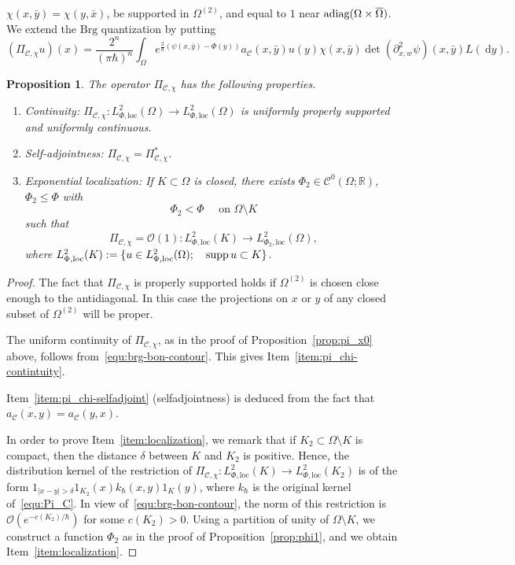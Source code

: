 \documentclass{article}
\newtheorem{prop}[theo]{Proposition}
\newcommand{\loc}{\mathrm{loc}}
\newcommand{\Brg}{\mathrm{Brg}}
\newcommand{\abs}[1]{\left|#1\right|}
\newcommand{\DD}{\:\!\mathrm{d}}
\newcommand{\spt}{\mathop{\textup{supp}}}
\newcommand{\adiag}{\textup{adiag}}
\newcommand{\RM}{\mathbb{R}}
\newcommand{\h}{\hbar}
\begin{document}
$\chi(x,\bar y) = \chi(y, \bar x)$, be supported in $\Omega^{(2)}$,
and equal to $1$ near $\adiag(\Omega\times\overline{\Omega})$. We
extend the $\Brg$ quantization by putting
\begin{equation}
  \label{equ:Pi_C}
  (\Pi_{\mathcal{C}, \chi} u) (x) = \frac{2^n}{(\pi\h)^n} \int_{\Omega}
  e^{\frac{2}{\h} (\psi(x, \bar{y})- \Phi(y))}
  a_{\mathcal{C}}(x,\bar{y})  u(y) \chi(x,\bar y)
  \det(\partial^2_{x,w} \psi)(x, \bar{y}) L(\DD y).
\end{equation}
\begin{prop}
  \label{prop:approx_proj}
  The operator $\Pi_{\mathcal{C}, \chi}$ has the following properties.
  \begin{enumerate}
  \item \emph{Continuity:}
    \label{item:pi_chi-contintuity}
    $\Pi_{\mathcal{C}, \chi}: L_{ \Phi,\loc}^{2}(\Omega) \to L_{
      \Phi,\loc}^{2}(\Omega)$
    is uniformly properly supported and uniformly continuous.
  \item \emph{Self-adjointness:}
    \label{item:pi_chi-selfadjoint}
    $\Pi_{\mathcal{C}, \chi} = \Pi_{\mathcal{C}, \chi}^*$.
  \item \label{item:localization}\emph{Exponential localization:} If
    $K\subset\Omega$ is closed, there exists
    $\Phi_2\in\mathscr{C}^0(\Omega;\RM)$, $\Phi_2\leq \Phi$ with
    \[
    \Phi_2 < \Phi \quad \text{ on } \Omega\setminus K
    \]
    such that
    \[
    \Pi_{\mathcal{C}, \chi} = \mathcal{O}(1): L_{ \Phi,\loc}^{2}(K)
    \to L_{ \Phi_2,\loc}^{2}(\Omega),
    \]
    where
    $L_{ \Phi,\loc}^{2}(K):=\{u\in L_{ \Phi,\loc}^{2}(\Omega); \quad
    \spt u \subset K\}$.
  \end{enumerate}
\end{prop}
\begin{proof}
  The fact that $\Pi_{\mathcal{C}, \chi}$ is properly supported holds
  if $\Omega^{(2)}$ is chosen close enough to the antidiagonal. In
  this case the projections on $x$ or $y$ of any closed subset of
  $\Omega^{(2)}$ will be proper.

  The uniform continuity of $\Pi_{\mathcal{C}, \chi}$, as in the proof
  of Proposition~\ref{prop:pi_x0} above, follows
  from~\eqref{equ:brg-bon-contour}. This gives
  Item~\ref{item:pi_chi-contintuity}.

  Item~\ref{item:pi_chi-selfadjoint} (selfadjointness) is deduced from
  the fact that
  $\overline{a_{\mathcal{C}}(x,y)} = a_{\mathcal{C}}(y,x)$.

  In order to prove Item~\ref{item:localization}, we remark that if
  $K_2\subset\Omega\setminus K$ is compact, then the distance $\delta$
  between $K$ and $K_2$ is positive. Hence, the distribution kernel of
  the restriction of
  $\Pi_{\mathcal{C}, \chi}: L_{ \Phi,\loc}^{2}(K) \to L_{
    \Phi,\loc}^{2}(K_2)$
  is of the form $1_{\abs{x-y}>\delta} 1_{K_2}(x)k_\h(x,y)1_{K}(y)$,
  where $k_\h$ is the original kernel of~\eqref{equ:Pi_C}. In view
  of~\eqref{equ:brg-bon-contour}, the norm of this restriction is
  $\mathcal{O}(e^{-c(K_2)/\h})$ for some $c(K_2)>0$. Using a partition
  of unity of $\Omega\setminus K$, we construct a function $\Phi_2$ as
  in the proof of Proposition~\ref{prop:phi1}, and we obtain
  Item~\ref{item:localization}.
\end{proof}
\end{document}
